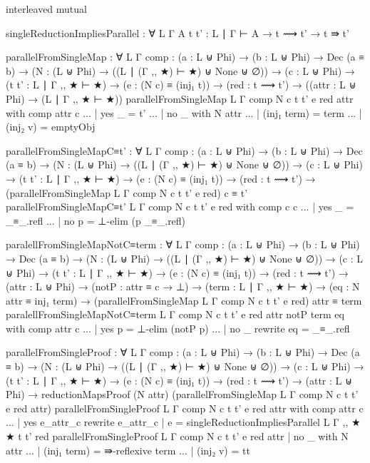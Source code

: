 {\begin{code}
interleaved mutual

  singleReductionImpliesParallel : ∀ {L Γ A}
    {t t' : L ∣ Γ ⊢ A} → t ⟿ t' → t ⇛ t'

  parallelFromSingleMap : ∀ {L Γ}
    {comp : (a : L ⊎ Phi) → (b : L ⊎ Phi) → Dec (a ≡ b)}
    → (N : (L ⊎ Phi) → ((L ∣ (Γ ,, ★) ⊢ ★) ⊎ None ⊎ ∅)) 
    → (c : L ⊎ Phi) 
    → (t t' : L ∣ Γ ,, ★ ⊢ ★) 
    → (e : (N c) ≡ (inj₁ t)) 
    → (red : t ⟿ t') 
    → ((attr : L ⊎ Phi) → (L ∣ Γ ,, ★ ⊢ ★))
  parallelFromSingleMap {L} {Γ} {comp} N c t t' e red attr with comp attr c
  ... | yes _ = t'
  ... | no _ with N attr
  ...   | (inj₁ term) = term
  ...   | (inj₂ v) = emptyObj

  parallelFromSingleMapC≡t' : ∀ {L Γ}
    {comp : (a : L ⊎ Phi) → (b : L ⊎ Phi) → Dec (a ≡ b)}
    → (N : (L ⊎ Phi) → ((L ∣ (Γ ,, ★) ⊢ ★) ⊎ None ⊎ ∅)) 
    → (c : L ⊎ Phi) 
    → (t t' : L ∣ Γ ,, ★ ⊢ ★) 
    → (e : (N c) ≡ (inj₁ t)) 
    → (red : t ⟿ t') 
    → (parallelFromSingleMap {L} {Γ} {comp} N c t t' e red) c ≡ t'
  parallelFromSingleMapC≡t' {L} {Γ} {comp} N c t t' e red with comp c c
  ... | yes _ = _≡_.refl
  ... | no p = ⊥-elim (p _≡_.refl)

  paralellFromSingleMapNotC≡term : ∀ {L Γ}
    {comp : (a : L ⊎ Phi) → (b : L ⊎ Phi) → Dec (a ≡ b)}
    → (N : (L ⊎ Phi) → ((L ∣ (Γ ,, ★) ⊢ ★) ⊎ None ⊎ ∅)) 
    → (c : L ⊎ Phi) 
    → (t t' : L ∣ Γ ,, ★ ⊢ ★) 
    → (e : (N c) ≡ (inj₁ t)) 
    → (red : t ⟿ t')
    → (attr : L ⊎ Phi)
    → (notP : attr ≡ c → ⊥)
    → (term : L ∣ Γ ,, ★ ⊢ ★)
    → (eq : N attr ≡ inj₁ term)
    → (parallelFromSingleMap {L} {Γ} {comp} N c t t' e red) attr ≡ term
  paralellFromSingleMapNotC≡term {L} {Γ} {comp}
    N c t t' e red attr notP term eq with comp attr c
  ... | yes p = ⊥-elim (notP p)
  ... | no _ rewrite eq = _≡_.refl

  parallelFromSingleProof : ∀ {L Γ}
    {comp : (a : L ⊎ Phi) → (b : L ⊎ Phi) → Dec (a ≡ b)}
    → (N : (L ⊎ Phi) → ((L ∣ (Γ ,, ★) ⊢ ★) ⊎ None ⊎ ∅))
    → (c : L ⊎ Phi) 
    → (t t' : L ∣ Γ ,, ★ ⊢ ★) 
    → (e : (N c) ≡ (inj₁ t)) 
    → (red : t ⟿ t') 
    → (attr : L ⊎ Phi)
    → reductionMapsProof
      (N attr) (parallelFromSingleMap {L} {Γ} {comp} N c t t' e red attr)
  parallelFromSingleProof {L} {Γ} {comp} N c t t' e red attr with comp attr c
  ... | yes e_attr_c rewrite e_attr_c | e =
    singleReductionImpliesParallel {L} {Γ ,, ★} {★} {t} {t'} red
  parallelFromSingleProof {L} {Γ} {comp} N c t t' e red attr
      | no _ with N attr
  ...   | (inj₁ term) = ⇛-reflexive term
  ...   | (inj₂ v) = tt


\end{code}}
